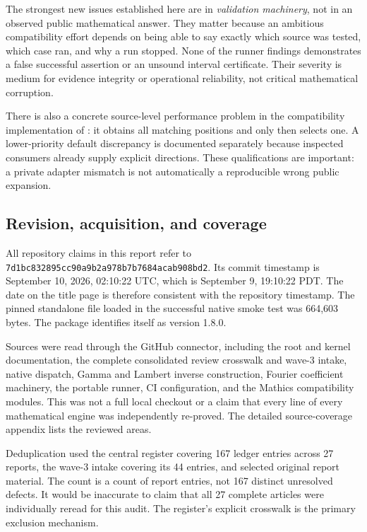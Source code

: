 \documentclass[11pt,letterpaper]{article}
\newcommand{\code}[1]{\texttt{\detokenize{#1}}}
\newcommand{\revision}{\texttt{7d1bc832895cc90a9b2a978b7b7684acab908bd2}}
\begin{document}
The strongest new issues established here are in \emph{validation machinery}, not in an observed public mathematical answer. They matter because an ambitious compatibility effort depends on being able to say exactly which source was tested, which case ran, and why a run stopped. None of the runner findings demonstrates a false successful assertion or an unsound interval certificate. Their severity is medium for evidence integrity or operational reliability, not critical mathematical corruption.

There is also a concrete source-level performance problem in the compatibility implementation of \code{FirstPosition}: it obtains all matching positions and only then selects one. A lower-priority \code{Limit} default discrepancy is documented separately because inspected consumers already supply explicit directions. These qualifications are important: a private adapter mismatch is not automatically a reproducible wrong public expansion.

\subsection{Revision, acquisition, and coverage}
All repository claims in this report refer to \revision. Its commit timestamp is September 10, 2026, 02:10:22 UTC, which is September 9, 19:10:22 PDT. The date on the title page is therefore consistent with the repository timestamp. The pinned standalone file loaded in the successful native smoke test was 664,603 bytes. The package identifies itself as version 1.8.0.\cite{repo,readme}

Sources were read through the GitHub connector, including the root and kernel documentation, the complete consolidated review crosswalk and wave-3 intake, native dispatch, Gamma and Lambert inverse construction, Fourier coefficient machinery, the portable runner, CI configuration, and the Mathics compatibility modules. This was not a full local checkout or a claim that every line of every mathematical engine was independently re-proved. The detailed source-coverage appendix lists the reviewed areas.

Deduplication used the central register covering 167 ledger entries across 27 reports, the wave-3 intake covering its 44 entries, and selected original report material. The count is a count of report entries, not 167 distinct unresolved defects. It would be inaccurate to claim that all 27 complete articles were individually reread for this audit. The register's explicit crosswalk is the primary exclusion mechanism.\cite{register,wave3,old23}
\end{document}
